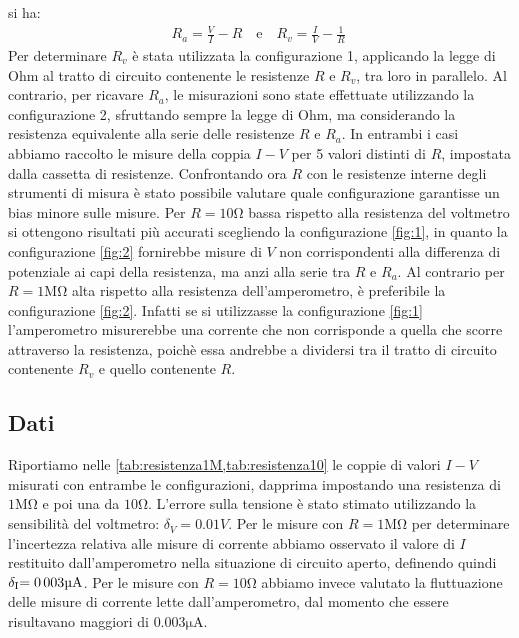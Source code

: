\documentclass[a4paper]{article}
\begin{document}
si ha:
\begin{align}
	 & R_a = \frac {V}{I} - R \quad \text{e} \quad R_v = \frac {I}{V} - \frac{1}{R}\quad \label{eq:1}
\end{align}
Per determinare \( \mathit{R_v} \) è stata utilizzata la configurazione 1,
applicando la legge di Ohm al tratto di circuito contenente le resistenze \( \mathit{R} \) e \( \mathit{R_v} \), tra loro in parallelo.
Al contrario, per ricavare \( \mathit{R_a} \), le misurazioni sono state effettuate utilizzando la configurazione 2,
sfruttando sempre la legge di Ohm, ma considerando la resistenza equivalente alla serie delle resistenze \( \mathit{R} \) e \( \mathit{R_a} \).
In entrambi i casi abbiamo raccolto le misure della coppia \( \mathit{I-V} \) per 5 valori distinti di \( \mathit{R} \), impostata dalla cassetta di resistenze.
Confrontando ora \(R\) con le resistenze interne degli strumenti di misura è stato possibile valutare quale configurazione garantisse un bias minore sulle misure.
Per \(R = 10\si{\ohm}\) bassa rispetto alla resistenza del voltmetro si ottengono risultati più accurati scegliendo la configurazione \ref{fig:1}, in quanto la configurazione \ref{fig:2}
fornirebbe misure di \( V \) non corrispondenti alla differenza di potenziale ai capi della resistenza, ma anzi alla serie tra \(R\) e \(R_a\).
Al contrario per \(R=1\si{\mega\ohm}\) alta rispetto alla resistenza dell'amperometro, è preferibile la configurazione \ref{fig:2}.
Infatti se si utilizzasse la configurazione \ref{fig:1} l'amperometro misurerebbe una corrente che non corrisponde a quella che scorre attraverso la resistenza, poichè essa andrebbe a dividersi tra il tratto di circuito contenente \(R_v\) e quello contenente \(R\).
\subsection{Dati}
Riportiamo nelle \cref{tab:resistenza1M,tab:resistenza10} le coppie di valori \(I-V\) misurati con entrambe le configurazioni, dapprima impostando una resistenza di $1\si{\mega\ohm}$ e poi una da $10\si{\ohm}$.
L'errore sulla tensione è stato stimato utilizzando la sensibilità del voltmetro: \( \si{\delta_{V}=0.01 V} \). Per le misure con \(R=1\si{\mega\ohm}\) per determinare l'incertezza relativa alle misure
di corrente abbiamo osservato il valore di \(I\) restituito dall'amperometro nella situazione di circuito aperto, definendo quindi \( \si{\delta_{I}=0.003 {\micro\ampere}} \). Per le misure con \(R=10\si{\ohm}\) abbiamo invece valutato la fluttuazione delle misure di corrente lette dall'amperometro, dal momento che essere risultavano maggiori di $0.003 \si{\micro\ampere}$.
\end{document}
